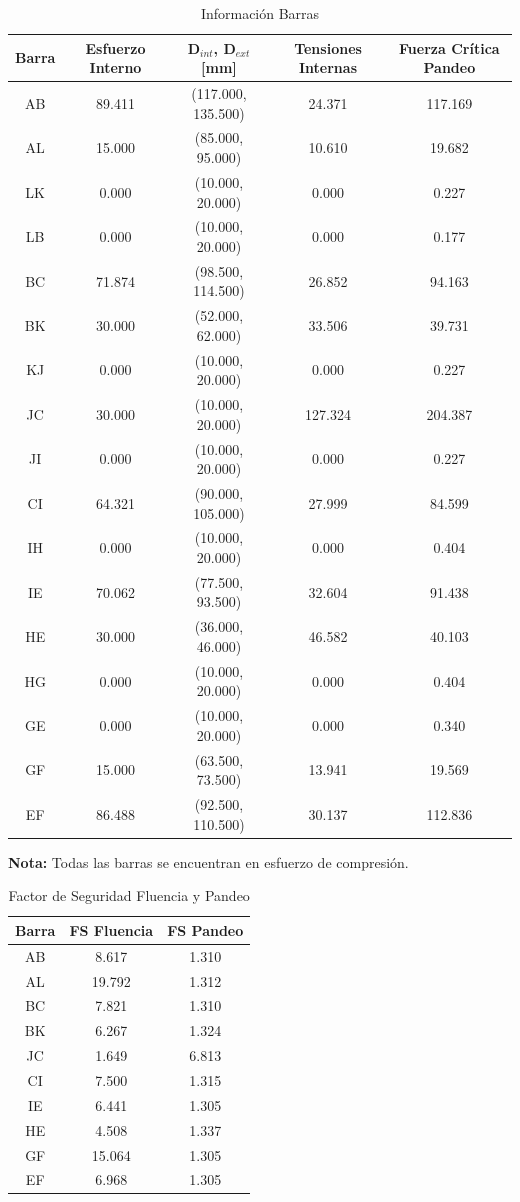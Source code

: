 \begin{table}[H]
    \centering
    \begin{tabular}{|c|c|c|c|c|}
    \hline
    \textbf{Barra} & \textbf{Esfuerzo Interno} & \textbf{D$_{int}$, D$_{ext}$ [mm]} & \textbf{Tensiones Internas} & \textbf{Fuerza Crítica Pandeo} \\ 
    \hline
    AB & 89.411 & (117.000, 135.500) & 24.371 & 117.169 \\ 
    AL & 15.000 & (85.000, 95.000) & 10.610 & 19.682 \\ 
    LK & 0.000 & (10.000, 20.000) & 0.000 & 0.227 \\ 
    LB & 0.000 & (10.000, 20.000) & 0.000 & 0.177 \\ 
    BC & 71.874 & (98.500, 114.500) & 26.852 & 94.163 \\ 
    BK & 30.000 & (52.000, 62.000) & 33.506 & 39.731 \\ 
    KJ & 0.000 & (10.000, 20.000) & 0.000 & 0.227 \\ 
    JC & 30.000 & (10.000, 20.000) & 127.324 & 204.387 \\ 
    JI & 0.000 & (10.000, 20.000) & 0.000 & 0.227 \\ 
    CI & 64.321 & (90.000, 105.000) & 27.999 & 84.599 \\ 
    IH & 0.000 & (10.000, 20.000) & 0.000 & 0.404 \\ 
    IE & 70.062 & (77.500, 93.500) & 32.604 & 91.438 \\ 
    HE & 30.000 & (36.000, 46.000) & 46.582 & 40.103 \\ 
    HG & 0.000 & (10.000, 20.000) & 0.000 & 0.404 \\ 
    GE & 0.000 & (10.000, 20.000) & 0.000 & 0.340 \\ 
    GF & 15.000 & (63.500, 73.500) & 13.941 & 19.569 \\ 
    EF & 86.488 & (92.500, 110.500) & 30.137 & 112.836 \\ 
    \hline
    \end{tabular}
    \caption{Información Barras}
\end{table}

\textbf{Nota:} Todas las barras se encuentran en esfuerzo de compresión.

\begin{table}[H]
\centering
\begin{tabular}{|c|c|c|}
\hline
\textbf{Barra} & \textbf{FS Fluencia} & \textbf{FS Pandeo} \\ 
\hline
AB & 8.617 & 1.310 \\ 
AL & 19.792 & 1.312 \\ 
BC & 7.821 & 1.310 \\ 
BK & 6.267 & 1.324 \\ 
JC & 1.649 & 6.813 \\ 
CI & 7.500 & 1.315 \\ 
IE & 6.441 & 1.305 \\ 
HE & 4.508 & 1.337 \\ 
GF & 15.064 & 1.305 \\ 
EF & 6.968 & 1.305 \\ 
\hline
\end{tabular}
\caption{Factor de Seguridad Fluencia y Pandeo}
\end{table}

